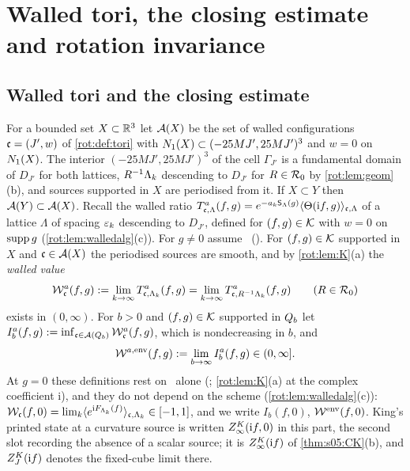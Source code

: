 \section{Walled tori, the closing estimate and rotation invariance}

\subsection{Walled tori and the closing estimate}

\begin{definition}\label{rot:def:walls}
For a bounded set $X\subset\mathbb R^3$ let $\mathcal A(X)$ be the set of walled configurations $\mathfrak c=(J',w)$ of \cref{rot:def:tori} with
$N_{1}(X)\subset(-25MJ',25MJ')^3$ and $w=0$ on $N_{1}(X)$. The interior $(-25MJ',25MJ')^3$ of the cell $\Gamma_{J'}$ is a
fundamental domain of $D_{J'}$ for both lattices, $R^{-1}\Lambda_k$ descending to $D_{J'}$ for $R\in\mathcal R_0$ by \cref{rot:lem:geom}(b), and
sources supported in $X$ are periodised from it. If $X\subset Y$ then $\mathcal A(Y)\subset\mathcal A(X)$. Recall the walled ratio
$T^{a}_{\mathfrak c,\Lambda}(f,g)=e^{-a_k\mathsf S_\Lambda(g)}\langle\Theta(\mathrm if,g)\rangle_{\mathfrak c,\Lambda}$ of a lattice $\Lambda$ of spacing
$\varepsilon_k$ descending to $D_{J'}$, defined for $(f,g)\in\mathcal K$ with $w=0$ on $\operatorname{supp} g$ (\cref{rot:lem:walledalg}(c)). For $g\ne0$ assume \Ka\ (). For
$(f,g)\in\mathcal K$ supported in $X$ and $\mathfrak c\in\mathcal A(X)$ the periodised sources are smooth, and by \cref{rot:lem:K}(a) the \emph{walled value}
\[
\mathcal W^a_{\mathfrak c}(f,g):=\lim_{k\to\infty}T^{a}_{\mathfrak c,\Lambda_k}(f,g)=\lim_{k\to\infty}T^{a}_{\mathfrak c,R^{-1}\Lambda_k}(f,g)\qquad(R\in\mathcal R_0)
\]
exists in $(0,\infty)$. For $b>0$ and $(f,g)\in\mathcal K$ supported in $Q_{b}$ let $I^a_b(f,g):=\inf_{\mathfrak c\in\mathcal A(Q_{b})}\mathcal W^a_{\mathfrak c}(f,g)$,
which is nondecreasing in $b$, and
\[
\mathcal W^{a,\mathrm{env}}(f,g):=\lim_{b\to\infty}I^a_b(f,g)\in(0,\infty].
\]
At $g=0$ these definitions rest on \Kz\ alone (; \cref{rot:lem:K}(a) at the complex coefficient $\mathrm i$), and they do not depend on the
scheme (\cref{rot:lem:walledalg}(c)): $\mathcal W_{\mathfrak c}(f,0)=\lim_k\langle e^{\mathrm iF_{\Lambda_k}(f)}\rangle_{\mathfrak c,\Lambda_k}\in[-1,1]$, and we write
$I_b(f,0)$, $\mathcal W^{\mathrm{env}}(f,0)$. King's printed state at a curvature source is written $Z^{K}_{\infty}(\mathrm if,0)$ in this part, the second slot
recording the absence of a scalar source; it is $Z^{K}_{\infty}(\mathrm if)$ of \cref{thm:s05:CK}(b), and $Z^{K}_{J}(\mathrm if)$ denotes the fixed-cube limit there.
\end{definition}

